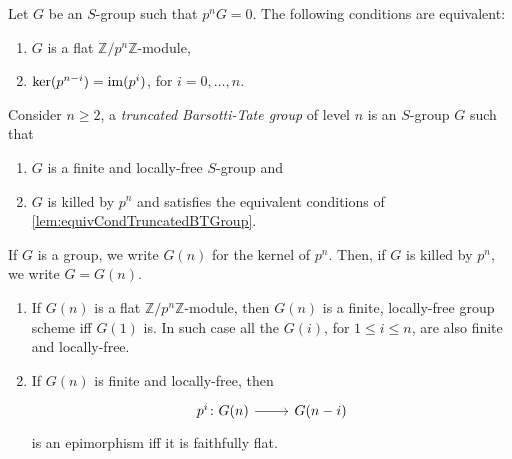 \begin{lem}\label{lem:equivCondTruncatedBTGroup}
	Let $G$ be an $S$-group such that $p^nG = 0$.
	The following conditions are equivalent:
\begin{enumerate}
	\item $G$ is a flat $\mathbb{Z}/p^n\mathbb{Z}$-module,

	\item $\ker(p^{n-i}) = \operatorname{im} (p^i)$, for $i=0, \ldots, n$.
\end{enumerate}
\end{lem} 


\newpage
\begin{defn}
	Consider $n \geq 2$, a \emph{truncated Barsotti-Tate group} of level $n$
	is an $S$-group $G$ such that
\begin{enumerate}
	\item $G$ is a finite and locally-free \(S\)-group and
	\item $G$ is killed by $p^n$ and satisfies the equivalent conditions of 
		\cref{lem:equivCondTruncatedBTGroup}.
\end{enumerate}
\end{defn}


\begin{defn}[]
	If $G$ is a group, we write $G(n)$ for the kernel of $p^n$.
	Then, if $G$ is killed by $p^n$, we write $G = G(n)$.
\end{defn}


\begin{lem}\label{FlatnessDescentTrBTGroup}\leavevmode\vspace{-.2\baselineskip}
\begin{enumerate}
	\item If $G(n)$ is a flat $\mathbb{Z}/p^n\mathbb{Z}$-module, then $G(n)$
		is a finite, locally-free group scheme iff
		$G(1)$ is. 
		In such case all the $G(i)$, for $1 \leq i \leq n$, are also finite and locally-free.

	\item If $G(n)$ is finite and locally-free, then
		\begin{equation*}
		\begin{tikzcd}[row sep = 0ex
			,/tikz/column 1/.append style={anchor=base east}
			,/tikz/column 2/.append style={anchor=base west}]
			p^i\colon G(n) \arrow[r, "", rightarrow] &
			G(n-i)
		\end{tikzcd}
		\end{equation*} 
		is an epimorphism iff it is faithfully flat.
\end{enumerate}
\end{lem} 


